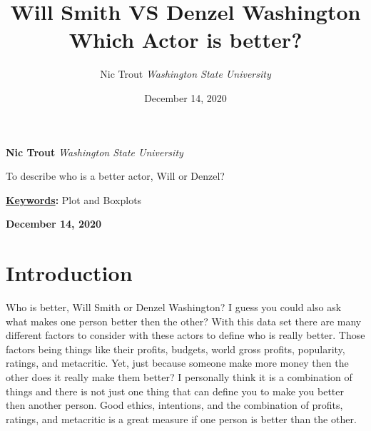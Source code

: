 \documentclass[]{article}
\title{\textbf{\textcolor{WSU.crimson}{Will Smith VS Denzel
Washington}} \newline \textbf{\textcolor{WSU.gray}{Which Actor is
better?}}  }
\author{\Large Nic
Trout\vspace{0.05in} \newline\normalsize\emph{Washington State
University}  }
\date{December 14, 2020}
\newcommand*{\authorfont}{\fontfamily{phv}\selectfont}
\renewenvironment{abstract}
 {{%
    \setlength{\leftmargin}{0mm}
    \setlength{\rightmargin}{\leftmargin}%
  }%
  \relax}
 {\endlist}
\begin{document}
	
%    


{%
\setlength{\parindent}{0pt}
\thispagestyle{plain}
{\fontsize{18}{20}\selectfont\raggedright 
\maketitle  %

}

{
   \vskip 13.5pt\relax \normalsize\fontsize{11}{12} 
   
\textbf{\authorfont Nic Trout} \hskip 15pt \emph{\small Washington State
University}   

}

}








\begin{abstract}

    \hbox{\vrule height .2pt width 39.14pc}

    \vskip 8.5pt %

\noindent \noindent To describe who is a better actor, Will or Denzel?


\vskip 8.5pt \noindent \textbf{\underline{Keywords}:} Plot and
Boxplots \par

    




    
    \hbox{\vrule height .2pt width 39.14pc}
    \vskip 5pt 
    \hfill \textbf{\textcolor{WSU.gray}{ December 14, 2020 } }
    \vskip 5pt 
    
\end{abstract}


\vskip -8.5pt




\noindent  

\section{Introduction}
\label{sec:intro}

Who is better, Will Smith or Denzel Washington? I guess you could also
ask what makes one person better then the other? With this data set
there are many different factors to consider with these actors to define
who is really better. Those factors being things like their profits,
budgets, world gross profits, popularity, ratings, and metacritic. Yet,
just because someone make more money then the other does it really make
them better? I personally think it is a combination of things and there
is not just one thing that can define you to make you better then
another person. Good ethics, intentions, and the combination of profits,
ratings, and metacritic is a great measure if one person is better than
the other.
\end{document}

